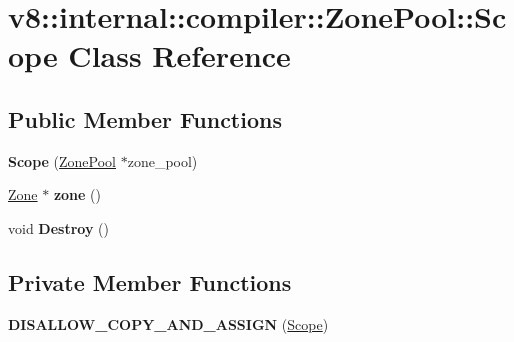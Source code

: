 \hypertarget{classv8_1_1internal_1_1compiler_1_1_zone_pool_1_1_scope}{}\section{v8\+:\+:internal\+:\+:compiler\+:\+:Zone\+Pool\+:\+:Scope Class Reference}
\label{classv8_1_1internal_1_1compiler_1_1_zone_pool_1_1_scope}
\subsection*{Public Member Functions}
\begin{DoxyCompactItemize}
\item 
{\bfseries Scope} (\hyperlink{classv8_1_1internal_1_1compiler_1_1_zone_pool}{Zone\+Pool} $\ast$zone\+\_\+pool)\hypertarget{classv8_1_1internal_1_1compiler_1_1_zone_pool_1_1_scope_a5c38b9ffc269c8fd63ef7228a9ffe397}{}\label{classv8_1_1internal_1_1compiler_1_1_zone_pool_1_1_scope_a5c38b9ffc269c8fd63ef7228a9ffe397}

\item 
\hyperlink{classv8_1_1internal_1_1_zone}{Zone} $\ast$ {\bfseries zone} ()\hypertarget{classv8_1_1internal_1_1compiler_1_1_zone_pool_1_1_scope_a32540e234e1f58078424799a11400ab1}{}\label{classv8_1_1internal_1_1compiler_1_1_zone_pool_1_1_scope_a32540e234e1f58078424799a11400ab1}

\item 
void {\bfseries Destroy} ()\hypertarget{classv8_1_1internal_1_1compiler_1_1_zone_pool_1_1_scope_af80f8c4a62266b272588b6f36c8f95ae}{}\label{classv8_1_1internal_1_1compiler_1_1_zone_pool_1_1_scope_af80f8c4a62266b272588b6f36c8f95ae}

\end{DoxyCompactItemize}
\subsection*{Private Member Functions}
\begin{DoxyCompactItemize}
\item 
{\bfseries D\+I\+S\+A\+L\+L\+O\+W\+\_\+\+C\+O\+P\+Y\+\_\+\+A\+N\+D\+\_\+\+A\+S\+S\+I\+GN} (\hyperlink{classv8_1_1internal_1_1compiler_1_1_zone_pool_1_1_scope}{Scope})\hypertarget{classv8_1_1internal_1_1compiler_1_1_zone_pool_1_1_scope_a6a90a397dbbf4a96f8690a56ff01b1a6}{}\label{classv8_1_1internal_1_1compiler_1_1_zone_pool_1_1_scope_a6a90a397dbbf4a96f8690a56ff01b1a6}

\end{DoxyCompactItemize}
